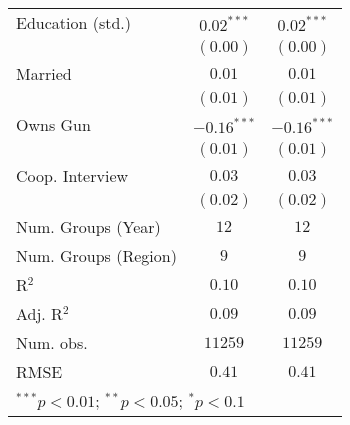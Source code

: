 \begin{table}
\begin{center}
\begin{tabular}{l c c}
Education (std.)        & $0.02^{***}$  & $0.02^{***}$  \\
                        & $(0.00)$      & $(0.00)$      \\
Married                 & $0.01$        & $0.01$        \\
                        & $(0.01)$      & $(0.01)$      \\
Owns Gun                & $-0.16^{***}$ & $-0.16^{***}$ \\
                        & $(0.01)$      & $(0.01)$      \\
Coop. Interview         & $0.03$        & $0.03$        \\
                        & $(0.02)$      & $(0.02)$      \\
\midrule
Num. Groups (Year)      & $12$          & $12$          \\
Num. Groups (Region)    & $9$           & $9$           \\
R$^2$                   & $0.10$        & $0.10$        \\
Adj. R$^2$              & $0.09$        & $0.09$        \\
Num. obs.               & $11259$       & $11259$       \\
RMSE                    & $0.41$        & $0.41$        \\
\bottomrule
\multicolumn{3}{l}{\scriptsize{$^{***}p<0.01$; $^{**}p<0.05$; $^{*}p<0.1$}}
\end{tabular}
\label{table_ate_region}
\end{center}
\end{table}
